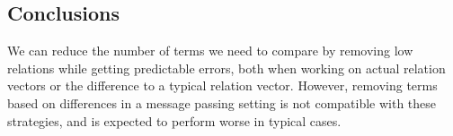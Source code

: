 \documentclass{sig-alternate}
\begin{document}
\subsection{Conclusions}

We can reduce the number of terms we need to compare by removing low relations while getting predictable errors, both when working on actual relation vectors or the difference to a typical relation vector.
However, removing terms based on differences in a message passing setting is not compatible with these strategies, and
is expected to perform worse in typical cases.
\end{document}
